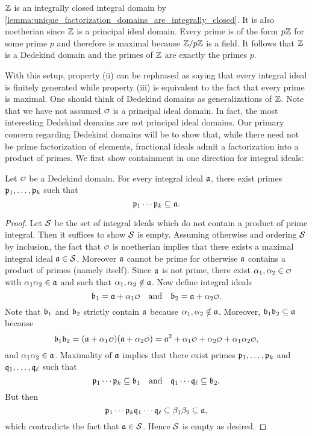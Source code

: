     \begin{remark}
      $\mathbb{Z}$ is an integrally closed integral domain by \cref{lemma:unique_factorization_domains_are_integrally_closed}. It is also noetherian since $\mathbb{Z}$ is a principal ideal domain. Every prime is of the form $p\mathbb{Z}$ for some prime $p$ and therefore is maximal because $\mathbb{Z}/p\mathbb{Z}$ is a field. It follows that $\mathbb{Z}$ is a Dedekind domain and the primes of $\mathbb{Z}$ are exactly the primes $p$.
    \end{remark}
    
    With this setup, property (ii) can be rephrased as saying that every integral ideal is finitely generated while property (iii) is equivalent to the fact that every prime is maximal. One should think of Dedekind domains as generalizations of $\mathbb{Z}$. Note that we have not assumed $\smc{O}$ is a principal ideal domain. In fact, the most interesting Dedekind domains are not principal ideal domains. Our primary concern regarding Dedekind domains will be to show that, while there need not be prime factorization of elements, fractional ideals admit a factorization into a product of primes. We first show containment in one direction for integral ideals:

    \begin{lemma}\label{lem:integral_ideal_prime_containment}
      Let $\smc{O}$ be a Dedekind domain. For every integral ideal $\mathfrak{a}$, there exist primes $\mathfrak{p}_{1},\ldots,\mathfrak{p}_{k}$ such that
      \[
        \mathfrak{p}_{1}\cdots\mathfrak{p}_{k} \subseteq \mathfrak{a}.
      \]
    \end{lemma}
    \begin{proof}
      Let $\mathcal{S}$ be the set of integral ideals which do not contain a product of prime integral. Then it suffices to show $\mathcal{S}$ is empty. Assuming otherwise and ordering $\mathcal{S}$ by inclusion, the fact that $\smc{O}$ is noetherian implies that there exists a maximal integral ideal $\mathfrak{a} \in \mathcal{S}$. Moreover $\mathfrak{a}$ cannot be prime for otherwise $\mathfrak{a}$ contains a product of primes (namely itself). Since $\mathfrak{a}$ is not prime, there exist $\a_{1},\a_{2} \in \smc{O}$ with $\alpha_{1}\alpha_{2} \in \mathfrak{a}$ and such that $\alpha_{1},\alpha_{2} \notin \mathfrak{a}$. Now define integral ideals
      \[
        \mf{b}_{1} = \mf{a}+\a_{1}\smc{O} \quad \text{and} \quad \mf{b}_{2} = \mf{a}+\a_{2}\smc{O}.
      \]
      Note that $\mathfrak{b}_{1}$ and $\mathfrak{b}_{2}$ strictly contain $\mathfrak{a}$ because $\alpha_{1},\alpha_{2} \notin \mathfrak{a}$. Moreover, $\mathfrak{b}_{1}\mathfrak{b}_{2} \subseteq \mathfrak{a}$ because
      \[
        \mf{b}_{1}\mf{b}_{2} = (\mf{a}+\a_{1}\smc{O})(\mf{a}+\a_{2}\smc{O}) = \mf{a}^{2}+\a_{1}\smc{O}+\a_{2}\smc{O}+\a_{1}\a_{2}\smc{O},
      \]
      and $\alpha_{1}\alpha_{2} \in \mathfrak{a}$. Maximality of $\mathfrak{a}$ implies that there exist primes $\mathfrak{p}_{1},\ldots,\mathfrak{p}_{k}$ and $\mathfrak{q}_{1},\ldots,\mathfrak{q}_{\ell}$ such that
      \[
        \mathfrak{p}_{1}\cdots\mathfrak{p}_{k} \subseteq \mathfrak{b}_{1} \quad \text{and} \quad \mathfrak{q}_{1}\cdots\mathfrak{q}_{\ell} \subseteq \mathfrak{b}_{2}.
      \]
      But then
      \[
        \mathfrak{p}_{1}\cdots\mathfrak{p}_{k}\mathfrak{q}_{1}\cdots\mathfrak{q}_{\ell} \subseteq \beta_{1}\beta_{2} \subseteq \mathfrak{a},
      \]
      which contradicts the fact that $\mathfrak{a} \in \mathcal{S}$. Hence $\mathcal{S}$ is empty as desired.
    \end{proof}

